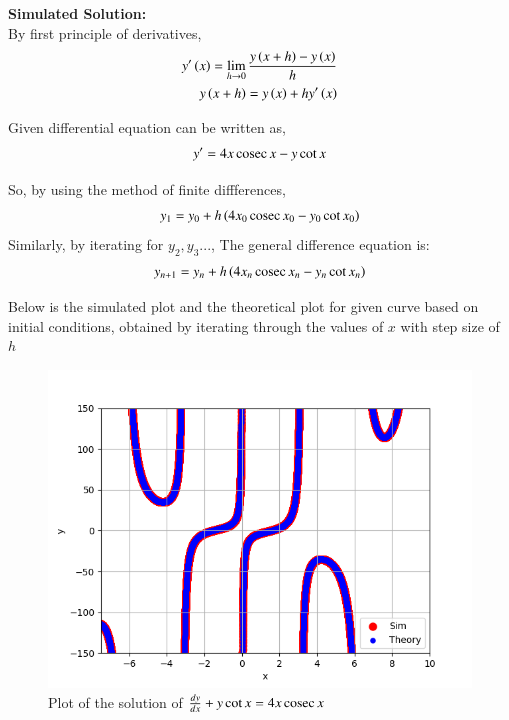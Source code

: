 \documentclass[journal]{IEEEtran}
\begin{document}
\textbf{Simulated Solution:}\\

By first principle of derivatives,
\begin{align}
	y^{\prime}\left(x\right) = \lim_{h\to 0}\frac{y\left(x+h\right) - y\left(x\right)}{h}\\
	y\left(x+h\right) = y\left(x\right) + hy^{\prime}\left(x\right)
\end{align}

Given differential equation can be written as,
\begin{align}
	y^{\prime} = 4x \,\text{cosec}\, x - y\cot x
\end{align}

So, by using the method of finite diffferences,
\begin{align}
	y_1 = y_0 + h \left(4x_0 \,\text{cosec}\, x_0 - y_0 \cot x_0\right)
\end{align}
Similarly, by iterating for $y_2, y_3$...,
The general difference equation is:
\begin{align}
	y_{n+1} = y_n + h \left(4x_n\,\text{cosec}\, x_n - y_n \cot x_n\right)
\end{align}

Below is the simulated plot and the theoretical plot for given curve  based on initial conditions, obtained by iterating through the values of $x$ with step size of $h$
\begin{figure}[h!]
	\centering
	\includegraphics[width=1\columnwidth]{figs/simulated.png}
	\caption{Plot of the solution of $\frac{dy}{dx} + y\cot x = 4x \,\text{cosec}\, x$}
	\label{stemplot}
\end{figure}
\end{document}
